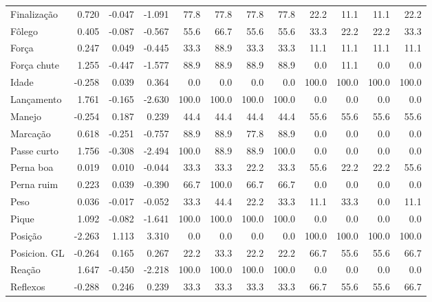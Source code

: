 \documentclass[doc,apacite,oneside,a4paper,12pt]{apa6}
\begin{document}
\begin{table}[ht]
\begin{small}
\begin{tabular}{l||rrr||rrr|r|||rrr||r}
\rowcolor{gray!10!}   Finalização & 0.720 & -0.047 & -1.091 & 77.8 & 77.8 & 77.8 & 77.8 & 22.2 & 11.1 & 11.1 & 22.2 \\ 
\rowcolor{gray!30!}   Fôlego & 0.405 & -0.087 & -0.567 & 55.6 & 66.7 & 55.6 & 55.6 & 33.3 & 22.2 & 22.2 & 33.3 \\ 
\rowcolor{gray!10!}   Força & 0.247 & 0.049 & -0.445 & 33.3 & 88.9 & 33.3 & 33.3 & 11.1 & 11.1 & 11.1 & 11.1 \\ 
\rowcolor{gray!30!}   Força chute & 1.255 & -0.447 & -1.577 & 88.9 & 88.9 & 88.9 & 88.9 & 0.0 & 11.1 & 0.0 & 0.0 \\ 
\rowcolor{gray!10!}   Idade & -0.258 & 0.039 & 0.364 & 0.0 & 0.0 & 0.0 & 0.0 & 100.0 & 100.0 & 100.0 & 100.0 \\ 
\rowcolor{gray!30!}   Lançamento & 1.761 & -0.165 & -2.630 & 100.0 & 100.0 & 100.0 & 100.0 & 0.0 & 0.0 & 0.0 & 0.0 \\ 
\rowcolor{gray!10!}   Manejo & -0.254 & 0.187 & 0.239 & 44.4 & 44.4 & 44.4 & 44.4 & 55.6 & 55.6 & 55.6 & 55.6 \\ 
\rowcolor{gray!30!}   Marcação & 0.618 & -0.251 & -0.757 & 88.9 & 88.9 & 77.8 & 88.9 & 0.0 & 0.0 & 0.0 & 0.0 \\ 
\rowcolor{gray!10!}   Passe curto & 1.756 & -0.308 & -2.494 & 100.0 & 88.9 & 88.9 & 100.0 & 0.0 & 0.0 & 0.0 & 0.0 \\ 
 \rowcolor{gray!30!}  Perna boa & 0.019 & 0.010 & -0.044 & 33.3 & 33.3 & 22.2 & 33.3 & 55.6 & 22.2 & 22.2 & 55.6 \\ 
\rowcolor{gray!10!}   Perna ruim & 0.223 & 0.039 & -0.390 & 66.7 & 100.0 & 66.7 & 66.7 & 0.0 & 0.0 & 0.0 & 0.0 \\ 
 \rowcolor{gray!30!}  Peso & 0.036 & -0.017 & -0.052 & 33.3 & 44.4 & 22.2 & 33.3 & 11.1 & 33.3 & 0.0 & 11.1 \\ 
\rowcolor{gray!10!}   Pique & 1.092 & -0.082 & -1.641 & 100.0 & 100.0 & 100.0 & 100.0 & 0.0 & 0.0 & 0.0 & 0.0 \\ 
\rowcolor{gray!30!}   Posição & -2.263 & 1.113 & 3.310 & 0.0 & 0.0 & 0.0 & 0.0 & 100.0 & 100.0 & 100.0 & 100.0 \\ 
 \rowcolor{gray!10!}  Posicion. GL & -0.264 & 0.165 & 0.267 & 22.2 & 33.3 & 22.2 & 22.2 & 66.7 & 55.6 & 55.6 & 66.7 \\ 
 \rowcolor{gray!30!}  Reação & 1.647 & -0.450 & -2.218 & 100.0 & 100.0 & 100.0 & 100.0 & 0.0 & 0.0 & 0.0 & 0.0 \\ 
\rowcolor{gray!10!}   Reflexos & -0.288 & 0.246 & 0.239 & 33.3 & 33.3 & 33.3 & 33.3 & 66.7 & 55.6 & 55.6 & 66.7 \\ 

\end{tabular}
\end{small}
\end{table}
\end{document}

